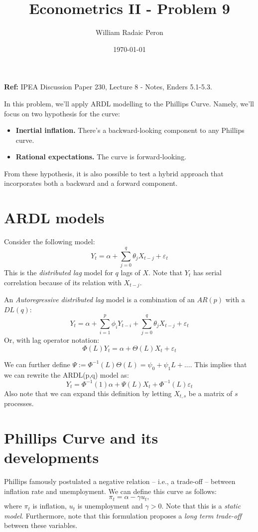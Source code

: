 \documentclass[
]{article}
\title{Econometrics II - Problem 9}
\author{William Radaic Peron}
\date{\today}
\begin{document}
\maketitle

\textbf{Ref:} IPEA Discussion Paper 230, Lecture 8 - Notes, Enders
5.1-5.3.

In this problem, we'll apply ARDL modelling to the Phillips Curve.
Namely, we'll focus on two hypothesis for the curve:

\begin{itemize}
\item \textbf{Inertial inflation.} There's a backward-looking component to any Phillips curve.
\item \textbf{Rational expectations.} The curve is forward-looking.
\end{itemize}

From these hypothesis, it is also possible to test a hybrid approach
that incorporates both a backward and a forward component.

\section{ARDL models}

Consider the following model:
\[ Y_t = \alpha + \sum_{j=0}^q \theta_j X_{t-j} + \varepsilon_t \] This
is the \emph{distributed lag} model for \(q\) lags of \(X\). Note that
\(Y_t\) has serial correlation because of its relation with \(X_{t-j}\).

An \emph{Autoregressive distributed lag} model is a combination of an
\(AR(p)\) with a \(DL(q)\):
\[ Y_t = \alpha + \sum_{i=1}^p \phi_i Y_{t-i} + \sum_{j=0}^q \theta_j X_{t-j} + \varepsilon_t \]
Or, with lag operator notation:
\[ \Phi (L) Y_t = \alpha + \Theta (L) X_t + \varepsilon_t \]

We can further define
\(\Psi := \Phi^{-1} (L) \Theta (L) = \psi_0 + \psi_1 L + ....\) This
implies that we can rewrite the ARDL(p,q) model as:
\[ Y_t = \Phi^{-1}(1)\alpha + \Psi (L) X_t + \Phi^{-1} (L) \varepsilon_t \]
Also note that we can expand this definition by letting \(X_{t,s}\) be a
matrix of \(s\) processes.

\section{Phillips Curve and its developments}

Phillips famously postulated a negative relation -- i.e., a trade-off --
between inflation rate and unemployment. We can define this curve as
follows: \[ \pi_t = \alpha - \gamma u_t, \] where \(\pi_t\) is
inflation, \(u_t\) is unemployment and \(\gamma > 0\). Note that this is
a \emph{static model}. Furthermore, note that this formulation proposes
a \emph{long term trade-off} between these variables.
\end{document}
